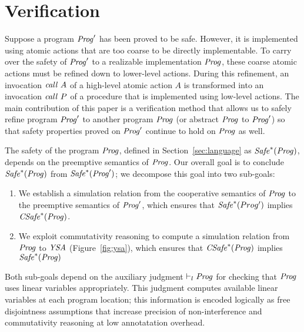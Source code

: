 \section{Verification}
\label{sec:verification}

Suppose a program $\mathit{Prog}'$ has been proved to be safe.
However, it is implemented using atomic actions that are too coarse to be directly implementable.  
To carry over the safety of $\mathit{Prog}'$ to a realizable implementation $\mathit{Prog}$, 
these coarse atomic actions must be refined down to lower-level actions.
During this refinement, an invocation $\mathit{call}\ A$ of a high-level atomic action $A$ is transformed into an 
invocation $\mathit{call}\ P$ of a procedure that is implemented using low-level actions.
The main contribution of this paper is a verification method that allows us to safely refine
program $\mathit{Prog}'$ to another program $\mathit{Prog}$ (or abstract $\mathit{Prog}$ to $\mathit{Prog}'$) so that 
safety properties proved on $\mathit{Prog}'$ continue to hold on $\mathit{Prog}$ as well.

The safety of the program $\mathit{Prog}$, defined in Section~\ref{sec:language} as $\mathit{Safe}^*(\mathit{Prog})$, depends on 
the preemptive semantics of $\mathit{Prog}$.
Our overall goal is to conclude $\mathit{Safe}^*(\mathit{Prog})$ from $\mathit{Safe}^*(\mathit{Prog}')$;
we decompose this goal into two sub-goals:
\begin{enumerate}
\item
We establish a simulation relation from the cooperative semantics of $\mathit{Prog}$ 
to the preemptive semantics of $\mathit{Prog}'$, which ensures that $\mathit{Safe}^*(Prog')$ implies $\mathit{CSafe}^*(\mathit{Prog})$.
\item
We exploit commutativity reasoning to compute a simulation relation from $\mathit{Prog}$ to $\mathit{YSA}$ (Figure~\ref{fig:ysa}),
which ensures that $\mathit{CSafe}^*(\mathit{Prog})$ implies $\mathit{Safe}^*(\mathit{Prog})$
\end{enumerate}
Both sub-goals depend on the auxiliary judgment $\vdash_l \mathit{Prog}$ for checking that $\mathit{Prog}$ uses linear variables appropriately.
This judgment computes available linear variables at each program location;
this information is encoded logically as free disjointness assumptions that increase precision of non-interference
and commutativity reasoning at low annotatation overhead.

